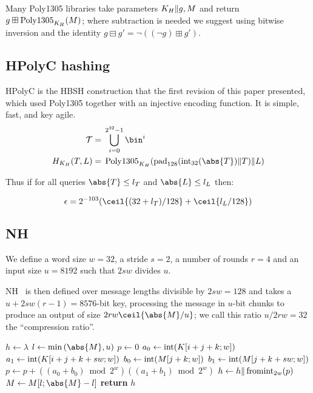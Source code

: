 \documentclass[eprint.tex]{subfiles}
\begin{document}
Many Poly1305 libraries
take parameters $K_H \Vert g, M$ and return $g \boxplus \operatorname{Poly1305}_{K_H}(M)$; where subtraction
is needed we suggest using bitwise inversion and the identity
$g \boxminus g' = \neg ((\neg g) \boxplus g')$.

\subsection{HPolyC hashing}
HPolyC is the HBSH construction that the first revision of this paper presented, which used
Poly1305 together with an injective encoding function.
It is simple, fast, and key agile.
\begin{align*}
\mathcal{T} ={}& \bigcup_{i=0}^{2^{32}-1}\bin^i \\
H_{K_H}(T, L) ={}& \Polydjb_{K_H}(\pad_{128}(\intify_{32}(\abs{T}) \Concat T) \Concat L) \\
\end{align*}

Thus if for all queries $\abs{T} \leq l_T$ and $\abs{L} \leq l_L$ then:

\begin{displaymath}
\epsilon = 2^{-103}(\ceil{(32 + l_T)/128} + \ceil{l_L/128})
\end{displaymath}\label{hpolycepsilon}

\subsection{NH}\label{nh}

We define a word size $w = 32$, a stride $s = 2$,
a number of rounds $r = 4$ and an input size $u = 8192$ such that $2sw$ divides $u$.

NH~\cite{umac1,umac2,rfc4418} is then defined over message
lengths divisible by $2sw = 128$
and takes a $u + 2sw(r -1) = 8576$-bit key, processing the message
in $u$-bit chunks to produce
an output of size $2rw\ceil{\abs{M}/u}$; we call this ratio $u/2rw = 32$ the ``compression ratio''.

\begin{algorithmic}[0]
    \State $h \gets \lambda$
        \State $l \gets \min{(\abs{M}, u)}$
            \State $p \gets 0$
                    \State $a_0 \gets \operatorname{int}(K[i+j+k;w])$
                    \State $a_1 \gets \operatorname{int}(K[i+j+k+sw;w])$
                    \State $b_0 \gets \operatorname{int}(M[j+k;w])$
                    \State $b_1 \gets \operatorname{int}(M[j+k+sw;w])$
                    \State $p \gets p + ((a_0 + b_0) \bmod 2^w)((a_1 + b_1) \bmod 2^w)$
                \EndFor
            \EndFor
            \State $h \gets h \Vert \operatorname{fromint}_{2w}(p)$
        \EndFor
        \State $M \gets M[l;\abs{M} - l]$
    \EndWhile
    \State \textbf{return} $h$
    \EndProcedure
\end{algorithmic}
\end{document}
